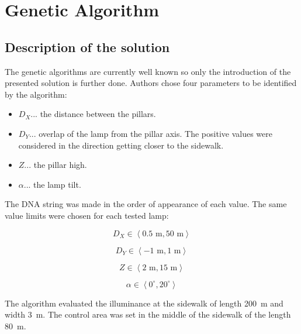 \section{Genetic Algorithm}
\subsection{Description of the solution}
The genetic algorithms are currently well known so only the introduction of the presented solution is further done. Authors chose four parameters to be identified by the algorithm:

\begin{itemize}
	\item $D_X$... the distance between the pillars.
	\item $D_Y$... overlap of the lamp from the pillar axis. The positive values were considered in the direction getting closer to the sidewalk.
	\item $Z$... the pillar high.
	\item $\alpha$... the lamp tilt.
\end{itemize}

The DNA string was made in the order of appearance of each value. The same value limits were chosen for each tested lamp:

\begin{equation}
D_X \in \left\langle 0.5 \text{ m}, 50 \text{ m}\right\rangle
\end{equation}

\begin{equation}
D_Y \in \left\langle -1 \text{ m}, 1 \text{ m}\right\rangle
\end{equation}

\begin{equation}
Z \in \left\langle 2 \text{ m}, 15 \text{ m}\right\rangle
\end{equation}

\begin{equation}
\alpha \in \left\langle 0^\circ, 20^\circ \right\rangle
\end{equation}

The algorithm evaluated the illuminance at the sidewalk of length 200~m and width 3~m. The control area was set in the middle of the sidewalk of the length 80~m.

